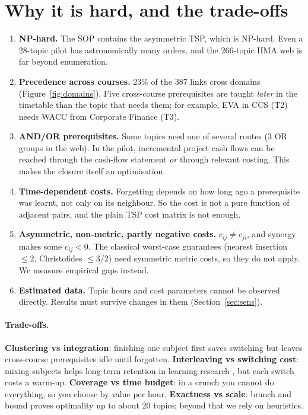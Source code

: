 \documentclass[11pt,a4paper]{article}
\begin{document}
\section{Why it is hard, and the trade-offs}
\label{sec:hard}
\begin{enumerate}[leftmargin=*]
\item \textbf{NP-hard.} The SOP contains the asymmetric TSP, which is NP-hard. Even a 28-topic pilot has astronomically many orders, and the 266-topic IIMA web is far beyond enumeration.
\item \textbf{Precedence across courses.} 23\% of the 387 links cross domains (Figure~\ref{fig:domains}). Five cross-course prerequisites are taught \emph{later} in the timetable than the topic that needs them; for example, EVA in CCS (T2) needs WACC from Corporate Finance (T3).
\item \textbf{AND/OR prerequisites.} Some topics need one of several routes (3 OR groups in the web). In the pilot, incremental project cash flows can be reached through the cash-flow statement \emph{or} through relevant costing. This makes the closure itself an optimisation.
\item \textbf{Time-dependent costs.} Forgetting depends on how long ago a prerequisite was learnt, not only on its neighbour. So the cost is not a pure function of adjacent pairs, and the plain TSP cost matrix is not enough.
\item \textbf{Asymmetric, non-metric, partly negative costs.} $c_{ij}\neq c_{ji}$, and synergy makes some $c_{ij}<0$. The classical worst-case guarantees (nearest insertion $\le 2$, Christofides $\le 3/2$) need symmetric metric costs, so they do not apply. We measure empirical gaps instead.
\item \textbf{Estimated data.} Topic hours and cost parameters cannot be observed directly. Results must survive changes in them (Section~\ref{sec:sens}).
\end{enumerate}

\paragraph{Trade-offs.}
\textbf{Clustering vs integration}: finishing one subject first saves switching but leaves cross-course prerequisites idle until forgotten.
\textbf{Interleaving vs switching cost}: mixing subjects helps long-term retention in learning research \citep{rohrer2007}, but each switch costs a warm-up.
\textbf{Coverage vs time budget}: in a crunch you cannot do everything, so you choose by value per hour.
\textbf{Exactness vs scale}: branch and bound proves optimality up to about 20 topics; beyond that we rely on heuristics.
\end{document}
